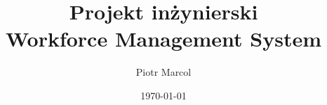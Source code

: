 %
%
%
% 
%
%

\documentclass[11pt,a4paper,titlepage,hidelinks]{article}

\usepackage[utf8]{inputenc}
\usepackage[polish]{babel}
\usepackage[T1]{fontenc}
\usepackage{float}
\usepackage{hyperref}
\usepackage{amsmath}
\usepackage{hyperref}
\usepackage[margin=1in]{geometry}
\usepackage{enumitem}

\usepackage{mathpazo} %


\newcommand\myemptypage{
	\null
	\thispagestyle{empty}
	\newpage
}

\newcommand\pageCounterMinusOne{
	\addtocounter{page}{-1}
}

\title{\Huge{Projekt inżynierski}\\\LARGE{Workforce Management System}}
\author{Piotr Marcol}
\date{\today}





